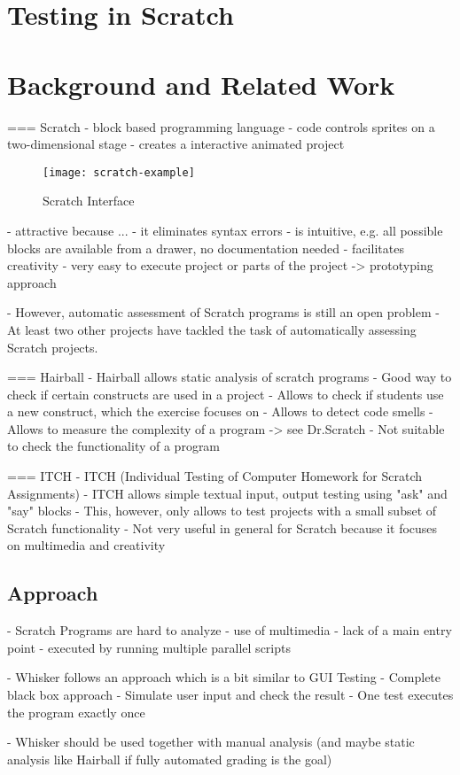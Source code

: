 \chapter{Testing in Scratch}

\chapter{Background and Related Work}

=== Scratch
- block based programming language
- code controls sprites on a two-dimensional stage
- creates a interactive animated project

\begin{wrapfigure}{r}{0.5\textwidth}
    \centering
    \texttt{[image: scratch-example]}
    \caption{Scratch Interface}
    \label{fig:scratch_interface}
\end{wrapfigure}

- attractive because ...
    - it eliminates syntax errors
    - is intuitive, e.g. all possible blocks are available from a drawer, no documentation needed
    - facilitates creativity
    - very easy to execute project or parts of the project -> prototyping approach

- However, automatic assessment of Scratch programs is still an open problem
- At least two other projects have tackled the task of automatically assessing Scratch projects.

=== Hairball
- Hairball \cite{hairball} allows static analysis of scratch programs
- Good way to check if certain constructs are used in a project
    - Allows to check if students use a new construct, which the exercise focuses on
- Allows to detect code smells
- Allows to measure the complexity of a program -> see Dr.Scratch
- Not suitable to check the functionality of a program

=== ITCH
- ITCH (Individual Testing of Computer Homework for Scratch Assignments) \cite{itch}
- ITCH allows simple textual input, output testing using "ask" and "say" blocks
- This, however,  only allows to test projects with a small subset of Scratch functionality
- Not very useful in general for Scratch because it focuses on multimedia and creativity

\section{Approach}
- Scratch Programs are hard to analyze
    - use of multimedia
    - lack of a main entry point
    - executed by running multiple parallel scripts

- Whisker follows an approach which is a bit similar to GUI Testing
- Complete black box approach
- Simulate user input and check the result
- One test executes the program exactly once

- Whisker should be used together with manual analysis (and maybe static analysis like Hairball if fully automated grading is the goal)
